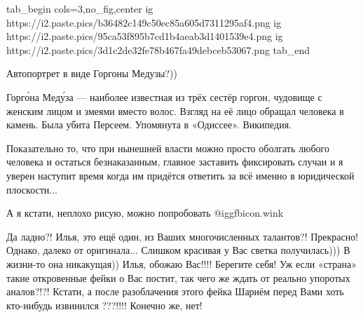 \begin{itemize}
\ifcmt
tab_begin cols=3,no_fig,center
  ig https://i2.paste.pics/b36482c149c50ec85a605d7311295af4.png
	ig https://i2.paste.pics/95ca53f895b7cd1b4aeab3d1401539e4.png
	ig https://i2.paste.pics/3d1c2de32fe78b467fa49debceb53067.png
tab_end
\fi


Автопортрет в виде Горгоны Медузы?))

Горго́на Меду́за — наиболее известная из трёх сестёр горгон, чудовище с женским
лицом и змеями вместо волос. Взгляд на её лицо обращал человека в камень. Была
убита Персеем. Упомянута в «Одиссее». Википедия.


Показательно то, что при нынешней власти можно просто оболгать любого человека
и остаться безнаказанным, главное заставить фиксировать случаи и я уверен
наступит время когда им придётся ответить за всё именно в юридической
плоскости...

А я кстати, неплохо рисую, можно попробовать  @igg{fbicon.wink} 


Да ладно?! Илья, это ещё один, из Ваших многочисленных талантов?! Прекрасно!
Однако, далеко от оригинала... Слишком красивая у Вас светка получилась))) В
жизни-то она никакущая)) Илья, обожаю Вас!!!! Берегите себя! Уж если «страна»
такие откровенные фейки о Вас постит, так чего же ждать от реально упоротых
аналов?!?! Кстати, а после разоблачения этого фейка Шариём перед Вами хоть
кто-нибудь извинился ???!!!! Конечно же, нет!

\end{itemize} %
